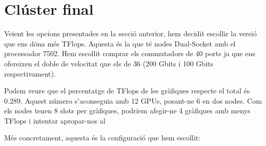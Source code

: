 \section{Clúster final}
Veient les opcions presentades en la secció anterior,  hem decidit escollir la versió que ens dóna més TFlops. Aquesta és la que té nodes Dual-Socket amb el processador 7502. Hem escollit comprar els commutadors de 40 ports ja que ens ofereixen el doble de velocitat que els de 36 (200 Gbits i 100 Gbits respectivament).

Podem veure que el percentatge de TFlops de les gràfiques respecte el total és 0.289. Aquest número s'aconseguia amb 12 GPUs, posant-ne 6 en dos nodes. Com els nodes tenen 8 slots per gràfiques, podriem afegir-ne 4 gràfiques amb menys TFlops i intentar apropar-nos al 

Més concretament, aquesta és la configuració que hem escollit:
